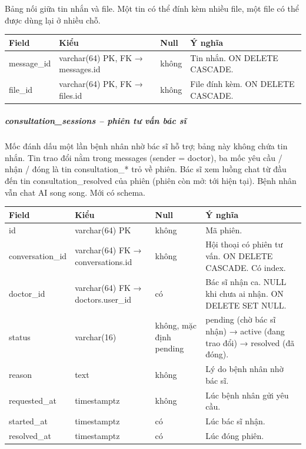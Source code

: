 Bảng nối giữa tin nhắn và file. Một tin có thể đính kèm nhiều file, một file có thể được dùng lại ở nhiều chỗ.
\begin{longtable}{|>{\raggedright\arraybackslash}p{0.250\dimexpr\linewidth-8\tabcolsep\relax}|>{\raggedright\arraybackslash}p{0.250\dimexpr\linewidth-8\tabcolsep\relax}|>{\raggedright\arraybackslash}p{0.250\dimexpr\linewidth-8\tabcolsep\relax}|>{\raggedright\arraybackslash}p{0.250\dimexpr\linewidth-8\tabcolsep\relax}|}
\hline
\textbf{Field} & \textbf{Kiểu} & \textbf{Null} & \textbf{Ý nghĩa} \\ \hline
\endhead
message\_id & varchar(64) PK, FK → messages.id & không & Tin nhắn. ON DELETE CASCADE. \\ \hline
file\_id & varchar(64) PK, FK → files.id & không & File đính kèm. ON DELETE CASCADE. \\ \hline
\end{longtable}

\subparagraph{consultation\_sessions -- phiên tư vấn bác sĩ}

Mốc đánh dấu một lần bệnh nhân nhờ bác sĩ hỗ trợ; bảng này không chứa tin nhắn. Tin trao đổi nằm trong messages (sender = doctor), ba mốc yêu cầu / nhận / đóng là tin consultation\_* trỏ về phiên. Bác sĩ xem luồng chat từ đầu đến tin consultation\_resolved của phiên (phiên còn mở: tới hiện tại). Bệnh nhân vẫn chat AI song song. Mới có schema.
\begin{longtable}{|>{\raggedright\arraybackslash}p{0.250\dimexpr\linewidth-8\tabcolsep\relax}|>{\raggedright\arraybackslash}p{0.250\dimexpr\linewidth-8\tabcolsep\relax}|>{\raggedright\arraybackslash}p{0.250\dimexpr\linewidth-8\tabcolsep\relax}|>{\raggedright\arraybackslash}p{0.250\dimexpr\linewidth-8\tabcolsep\relax}|}
\hline
\textbf{Field} & \textbf{Kiểu} & \textbf{Null} & \textbf{Ý nghĩa} \\ \hline
\endhead
id & varchar(64) PK & không & Mã phiên. \\ \hline
conversation\_id & varchar(64) FK → conversations.id & không & Hội thoại có phiên tư vấn. ON DELETE CASCADE. Có index. \\ \hline
doctor\_id & varchar(64) FK → doctors.user\_id & có & Bác sĩ nhận ca. NULL khi chưa ai nhận. ON DELETE SET NULL. \\ \hline
status & varchar(16) & không, mặc định pending & pending (chờ bác sĩ nhận) → active (đang trao đổi) → resolved (đã đóng). \\ \hline
reason & text & không & Lý do bệnh nhân nhờ bác sĩ. \\ \hline
requested\_at & timestamptz & không & Lúc bệnh nhân gửi yêu cầu. \\ \hline
started\_at & timestamptz & có & Lúc bác sĩ nhận. \\ \hline
resolved\_at & timestamptz & có & Lúc đóng phiên. \\ \hline
\end{longtable}

